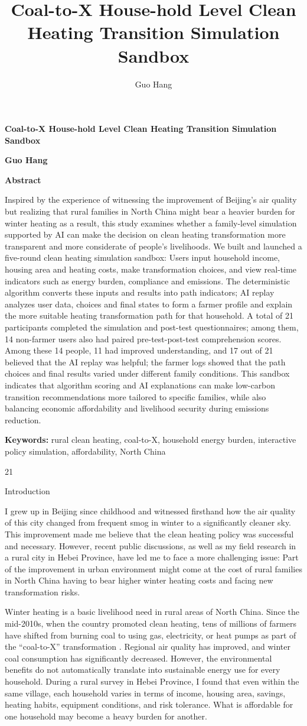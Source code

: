 \documentclass[stu,12pt,floatsintext,donotrepeattitle]{apa7}
\title{Coal-to-X House-hold Level Clean Heating Transition Simulation Sandbox}
\author{Guo Hang}
\makeatletter
\newcommand{\Sanhao}{\fontsize{16pt}{20pt}\selectfont}
\newcommand{\Sihao}{\fontsize{14pt}{18pt}\selectfont}
\newlength{\FourLetterIndent}
\newcommand{\papertitle}{Coal-to-X House-hold Level Clean Heating Transition Simulation Sandbox}
\newcommand{\paperauthor}{Guo Hang}
\newcommand{\paperabstract}{Inspired by the experience of witnessing the improvement of Beijing's air quality but realizing that rural families in North China might bear a heavier burden for winter heating as a result, this study examines whether a family-level simulation supported by AI can make the decision on clean heating transformation more transparent and more considerate of people's livelihoods. We built and launched a five-round clean heating simulation sandbox: Users input household income, housing area and heating costs, make transformation choices, and view real-time indicators such as energy burden, compliance and emissions. The deterministic algorithm converts these inputs and results into path indicators; AI replay analyzes user data, choices and final states to form a farmer profile and explain the more suitable heating transformation path for that household. A total of 21 participants completed the simulation and post-test questionnaires; among them, 14 non-farmer users also had paired pre-test-post-test comprehension scores. Among these 14 people, 11 had improved understanding, and 17 out of 21 believed that the AI replay was helpful; the farmer logs showed that the path choices and final results varied under different family conditions. This sandbox indicates that algorithm scoring and AI explanations can make low-carbon transition recommendations more tailored to specific families, while also balancing economic affordability and livelihood security during emissions reduction.}
\newcommand{\paperkeywords}{rural clean heating, coal-to-X, household energy burden, interactive policy simulation, affordability, North China}
\renewcommand{\section}{\@startsection{section}{1}{\z@}%
  {2\baselineskip}{1\baselineskip}%
  {\normalfont\Sanhao\bfseries\raggedright}}
\makeatother
\begin{document}
\pagestyle{empty}
\begin{titlepage}
  \centering
  \vspace*{\fill}
  {\Sanhao\bfseries \papertitle\par}
  \vspace{2em}
  {\Sihao\bfseries \paperauthor\par}
  \vspace*{\fill}
\end{titlepage}

\newpage
\thispagestyle{otherpage}
\pagestyle{otherpage}
\begin{center}
  {\Sanhao\bfseries Abstract}
\end{center}
\vspace{\baselineskip}
\begin{doublespacing}
\noindent\paperabstract\par
\vspace{\baselineskip}
\noindent\textbf{Keywords:} \paperkeywords\par
\end{doublespacing}

\newpage
\onehalfspacing
\settowidth{\FourLetterIndent}{abcd}
\setlength{\parindent}{\FourLetterIndent}
\setcounter{secnumdepth}{3}
\setcounter{section}{0}

\section{Introduction}

I grew up in Beijing since childhood and witnessed firsthand how the air quality of this city changed from frequent smog in winter to a significantly cleaner sky. This improvement made me believe that the clean heating policy was successful and necessary. However, recent public discussions, as well as my field research in a rural city in Hebei Province, have led me to face a more challenging issue: Part of the improvement in urban environment might come at the cost of rural families in North China having to bear higher winter heating costs and facing new transformation risks.

Winter heating is a basic livelihood need in rural areas of North China. Since the mid-2010s, when the country promoted clean heating, tens of millions of farmers have shifted from burning coal to using gas, electricity, or heat pumps as part of the ``coal-to-X'' transformation \cite{li2025scatteredcoal,ndrc2017plan}. Regional air quality has improved, and winter coal consumption has significantly decreased. However, the environmental benefits do not automatically translate into sustainable energy use for every household. During a rural survey in Hebei Province, I found that even within the same village, each household varies in terms of income, housing area, savings, heating habits, equipment conditions, and risk tolerance. What is affordable for one household may become a heavy burden for another.
\end{document}
